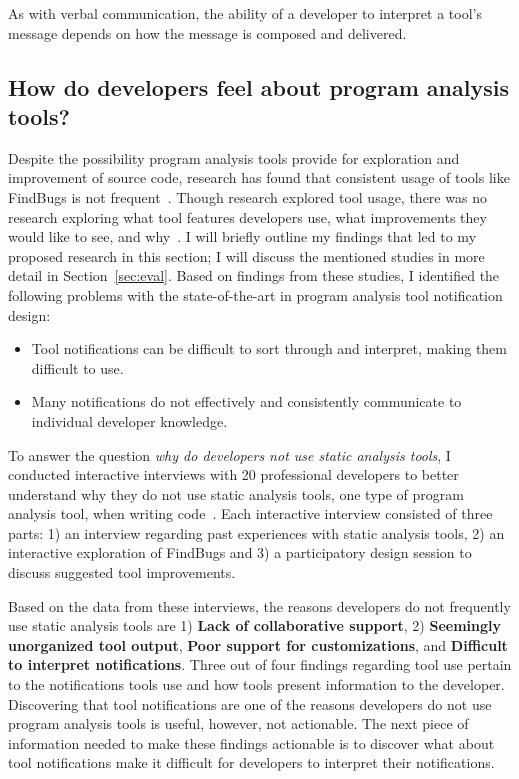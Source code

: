 \documentclass{llncs}
\begin{document}
As with verbal communication, the ability of a developer to interpret a tool's message depends on how the message is composed and delivered.

\subsection{How do developers feel about program analysis tools?}
Despite the possibility program analysis tools provide for exploration and improvement of source code, research has found that consistent usage of tools like FindBugs is not frequent~\cite{Ayewah:2008:FindBugs}.
Though research explored tool usage, there was no research exploring what tool features developers use, what improvements they would like to see, and why~\cite{Bessey:2010:Coverity,Khoo:2008:PathProjection}.
I will briefly outline my findings that led to my proposed research in this section; I will discuss the mentioned studies in more detail in Section~\ref{sec:eval}. Based on findings from these studies, I identified the following problems with the state-of-the-art in program analysis tool notification design:

\begin{itemize}
	\item Tool notifications can be difficult to sort through and interpret, making them difficult to use.
	\item Many notifications do not effectively and consistently communicate to individual developer knowledge.
\end{itemize}

To answer the question \emph{why do developers not use static analysis tools}, I conducted interactive interviews with 20 professional developers to better understand why they do not use static analysis tools, one type of program analysis tool, when writing code~\cite{johnson2013don}.
Each interactive interview consisted of three parts: 1) an interview regarding past experiences with static analysis tools, 2) an interactive exploration of FindBugs and 3) a participatory design session to discuss suggested tool improvements.

Based on the data from these interviews, the reasons developers do not frequently use static analysis tools are 1) \textbf{Lack of collaborative support}, 2) \textbf{Seemingly unorganized tool output}, \textbf{Poor support for customizations}, and \textbf{Difficult to interpret notifications}. 
Three out of four findings regarding tool use pertain to the notifications tools use and how tools present information to the developer.
Discovering that tool notifications are one of the reasons developers do not use program analysis tools is useful, however, not actionable. The next piece of information needed to make these findings actionable is to discover what about tool notifications make it difficult for developers to interpret their notifications. 
\end{document}
